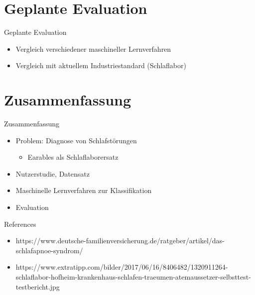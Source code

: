 \documentclass[18pt]{beamer}
\begin{document}
\section{Geplante Evaluation}
\begin{frame}{Geplante Evaluation}
\begin{itemize}
	\item Vergleich verschiedener maschineller Lernverfahren
	\item Vergleich mit aktuellem Industriestandard (Schlaflabor)
\end{itemize}
\end{frame}

\section{Zusammenfassung}
\begin{frame}{Zusammenfassung}
\begin{itemize}
	\item Problem: Diagnose von Schlafstörungen
	\begin{itemize}
		\item Earables als Schlaflaborersatz
	\end{itemize}
	\item Nutzerstudie, Datensatz
	\item Maschinelle Lernverfahren zur Klassifikation
	\item Evaluation
\end{itemize}
\end{frame}

\appendix
\beginbackup

\begin{frame}[allowframebreaks]{References}
\begin{itemize}
	\item https://www.deutsche-familienversicherung.de/ratgeber/artikel/das-schlafapnoe-syndrom/
	\item https://www.extratipp.com/bilder/2017/06/16/8406482/1320911264-schlaflabor-hofheim-krankenhaus-schlafen-traeumen-atemaussetzer-selbsttest-testbericht.jpg
\end{itemize}
\printbibliography
\end{frame}

\backupend
\end{document}
